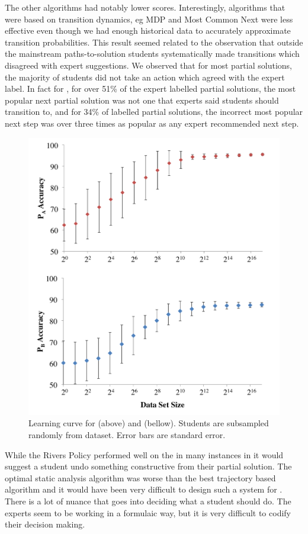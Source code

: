 The other algorithms had notably lower scores. Interestingly, algorithms that were based on transition dynamics, eg MDP and Most Common Next were less effective even though we  had enough historical data to accurately approximate transition probabilities. This result seemed related to the observation that outside the mainstream paths-to-solution students systematically made transitions which disagreed with expert suggestions. We observed that for most partial solutions, the majority of students did not take an action which agreed with the expert label. In fact for \Pa\hspace{-0.5mm}, for over 51\% of the expert labelled partial solutions, the most popular next partial solution was not one that experts said students should transition to, and for 34\% of labelled partial solutions, the incorrect most popular next step was over three times as popular as any expert recommended next step. 


\begin{figure}
\centering
\includegraphics[width=0.5\columnwidth]{img/lcs}
\caption[Poison path learning curve]{Learning curve for \Pa (above) and \Pb (bellow). Students are subsampled randomly from dataset. Error bars are standard error.}
\label{fig:learningCurve}
\end{figure}


While the Rivers Policy performed well on the \Pb in many instances in \Pa it would suggest a student undo something constructive from their partial solution. The optimal static analysis algorithm was worse than the best trajectory based algorithm and it would have been very difficult to design such a system for \Pb\hspace{-0.5mm}. There is a lot of nuance that goes into deciding what a student should do. The experts seem to be working in a formulaic way, but it is very difficult to codify their decision making. 


